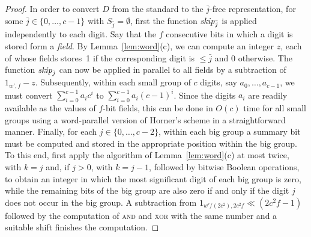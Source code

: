 \documentclass[envcountsame,envcountsect,undated,nolinenumbers]{lnthi}
\def\Tvn#1{\hbox{\textit{#1\/}}}
\def\jj{{\bar j}}
\begin{document}
\begin{proof}
In order to convert $D$ from the standard to the
$\jj$-free representation, for some $\jj\in\{0,\ldots,c-1\}$
with $S_\jj=\emptyset$, first the function
$\Tvn{skip}_\jj$ is applied independently
to each digit.
Say that the $f$ consecutive bits in which
a digit is stored form a \emph{field}.
By Lemma~\ref{lem:word}(c), we can compute an
integer $z$, each of whose fields stores~1
if the corresponding digit is $\le\jj$
and 0 otherwise.
The function $\Tvn{skip}_\jj$ can now be applied in parallel
to all fields by a subtraction of $1_{w',f}-z$.
Subsequently, within each small group of $c$
digits, say $a_0,\ldots,a_{c-1}$, we must
convert $\sum_{i=0}^{c-1}a_i c^i$ to
$\sum_{i=0}^{c-1}a_i(c-1)^i$.
Since the digits $a_i$ are readily available
as the values of $f$-bit fields,
this can be done in $O(c)$ time for all small groups
using a word-parallel version of Horner's scheme
in a straightforward manner.
Finally, for
each 
$j\in\{0,\ldots,c-2\}$,
within each big group a summary bit
must be computed and
stored in the appropriate position
within the big group.
To this end, first apply the algorithm of
Lemma~\ref{lem:word}(c) at most twice, with $k=j$ and,
if $j>0$, with $k=j-1$, followed by bitwise
Boolean operations, to obtain an integer in
which the most significant digit of each
big group is zero, while the remaining bits
of the big group are also zero
if and only if the digit $j$ does not occur
in the big group.
A subtraction from $1_{{{w'}/{(2c^2)}},2c^2 f}\ll(2c^2 f-1)$
followed by the computation of \textsc{and}
and \textsc{xor} with the same number and
a suitable shift finishes the computation.


\end{proof}
\end{document}
